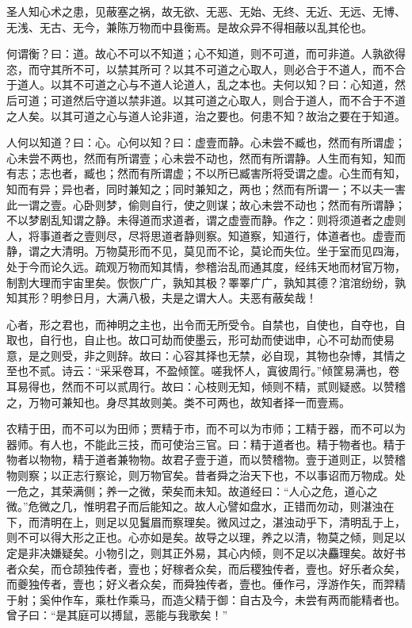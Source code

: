 \documentclass[]{article}
\begin{document}
圣人知心术之患，见蔽塞之祸，故无欲、无恶、无始、无终、无近、无远、无博、无浅、无古、无今，兼陈万物而中县衡焉。是故众异不得相蔽以乱其伦也。

何谓衡？曰：道。故心不可以不知道；心不知道，则不可道，而可非道。人孰欲得恣，而守其所不可，以禁其所可？以其不可道之心取人，则必合于不道人，而不合于道人。以其不可道之心与不道人论道人，乱之本也。夫何以知？曰：心知道，然后可道；可道然后守道以禁非道。以其可道之心取人，则合于道人，而不合于不道之人矣。以其可道之心与道人论非道，治之要也。何患不知？故治之要在于知道。

人何以知道？曰：心。心何以知？曰：虚壹而静。心未尝不臧也，然而有所谓虚；心未尝不两也，然而有所谓壹；心未尝不动也，然而有所谓静。人生而有知，知而有志；志也者，臧也；然而有所谓虚；不以所已臧害所将受谓之虚。心生而有知，知而有异；异也者，同时兼知之；同时兼知之，两也；然而有所谓一；不以夫一害此一谓之壹。心卧则梦，偷则自行，使之则谋；故心未尝不动也；然而有所谓静；不以梦剧乱知谓之静。未得道而求道者，谓之虚壹而静。作之：则将须道者之虚则人，将事道者之壹则尽，尽将思道者静则察。知道察，知道行，体道者也。虚壹而静，谓之大清明。万物莫形而不见，莫见而不论，莫论而失位。坐于室而见四海，处于今而论久远。疏观万物而知其情，参稽治乱而通其度，经纬天地而材官万物，制割大理而宇宙里矣。恢恢广广，孰知其极？睪睪广广，孰知其德？涫涫纷纷，孰知其形？明参日月，大满八极，夫是之谓大人。夫恶有蔽矣哉！

心者，形之君也，而神明之主也，出令而无所受令。自禁也，自使也，自夺也，自取也，自行也，自止也。故口可劫而使墨云，形可劫而使诎申，心不可劫而使易意，是之则受，非之则辞。故曰：心容其择也无禁，必自现，其物也杂博，其情之至也不贰。诗云：``采采卷耳，不盈倾筐。嗟我怀人，寘彼周行。''倾筐易满也，卷耳易得也，然而不可以贰周行。故曰：心枝则无知，倾则不精，贰则疑惑。以赞稽之，万物可兼知也。身尽其故则美。类不可两也，故知者择一而壹焉。

农精于田，而不可以为田师；贾精于市，而不可以为市师；工精于器，而不可以为器师。有人也，不能此三技，而可使治三官。曰：精于道者也。精于物者也。精于物者以物物，精于道者兼物物。故君子壹于道，而以赞稽物。壹于道则正，以赞稽物则察；以正志行察论，则万物官矣。昔者舜之治天下也，不以事诏而万物成。处一危之，其荣满侧；养一之微，荣矣而未知。故道经曰：``人心之危，道心之微。''危微之几，惟明君子而后能知之。故人心譬如盘水，正错而勿动，则湛浊在下，而清明在上，则足以见鬒眉而察理矣。微风过之，湛浊动乎下，清明乱于上，则不可以得大形之正也。心亦如是矣。故导之以理，养之以清，物莫之倾，则足以定是非决嫌疑矣。小物引之，则其正外易，其心内倾，则不足以决麤理矣。故好书者众矣，而仓颉独传者，壹也；好稼者众矣，而后稷独传者，壹也。好乐者众矣，而夔独传者，壹也；好义者众矣，而舜独传者，壹也。倕作弓，浮游作矢，而羿精于射；奚仲作车，乘杜作乘马，而造父精于御：自古及今，未尝有两而能精者也。曾子曰：``是其庭可以搏鼠，恶能与我歌矣！''
\end{document}
